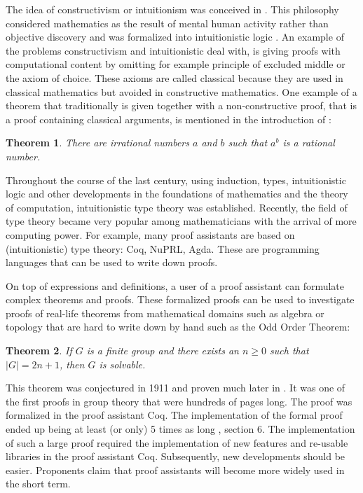 \documentclass[11pt,a4paper,twoside,xetex,draft]{book}
\newtheorem{theorem}{Theorem}[section]
\begin{document}
The idea of constructivism or intuitionism was conceived in \cite{Brouwer1905}. This philosophy considered mathematics as the result of mental human activity rather than objective discovery and was formalized into intuitionistic logic \cite{Heyting1930}. An example of the problems constructivism and intuitionistic deal with, is giving proofs with computational content by omitting for example principle of excluded middle or the axiom of choice. These axioms are called classical because they are used in classical mathematics but avoided in constructive mathematics. One example of a theorem that traditionally is given together with a non-constructive proof, that is a proof containing classical arguments, is mentioned in the introduction of \cite{Palmgren2014}:

\begin{theorem}
  There are irrational numbers $a$ and $b$ such that $a^b$ is a rational number.
\end{theorem} 

Throughout the course of the last century, using induction, types, intuitionistic logic and other developments in the foundations of mathematics and the theory of computation, intuitionistic type theory was established. Recently, the field of type theory became very popular among mathematicians with the arrival of more computing power. For example, many proof assistants are based on (intuitionistic) type theory: Coq, NuPRL, Agda. These are programming languages that can be used to write down proofs.

On top of expressions and definitions, a user of a proof assistant can formulate complex theorems and proofs. These formalized proofs can be used to investigate proofs of real-life theorems from mathematical domains such as algebra or topology that are hard to write down by hand such as the Odd Order Theorem:

\begin{theorem}
If $G$ is a finite group and there exists an $n \geq 0$ such that $|G| = 2n+1$, then $G$ is solvable.
\end{theorem}

This theorem was conjectured in 1911 and proven much later in \cite{Feit1963}. It was one of the first proofs in group theory that were hundreds of pages long. The proof was formalized in the proof assistant Coq. The implementation of the formal proof ended up being at least (or only) 5 times as long \cite{Gonthier2013}, section 6. The implementation of such a large proof required the implementation of new features and re-usable libraries in the proof assistant Coq. Subsequently, new developments should be easier. Proponents claim that proof assistants will become more widely used in the short term.
\end{document}
